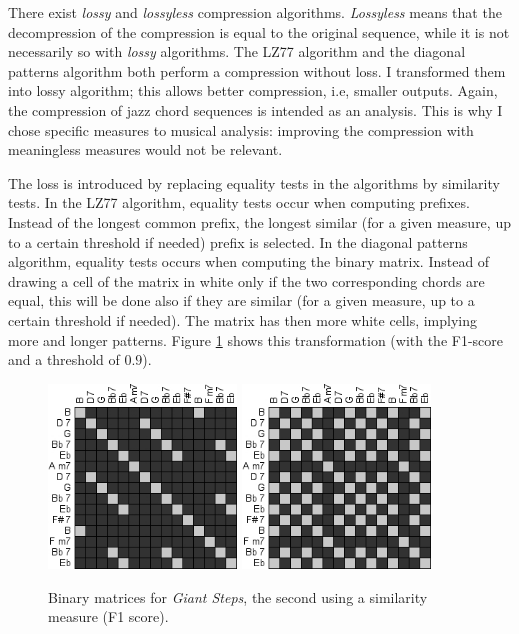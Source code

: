 \documentclass[a4paper,10pt]{article}
\begin{document}
There exist \emph{lossy} and \emph{lossyless} compression algorithms. \emph{Lossyless} means that the decompression of the compression is equal to the original sequence, while it is not necessarily so with \emph{lossy} algorithms. The LZ77 algorithm and the diagonal patterns algorithm both perform a compression without loss. I transformed them into lossy algorithm; this allows better compression, i.\!e, smaller outputs. Again, the compression of jazz chord sequences is intended as an analysis. This is why I chose specific measures to musical analysis: improving the compression with meaningless measures would not be relevant.

The loss is introduced by replacing equality tests in the algorithms by similarity tests. In the LZ77 algorithm, equality tests occur when computing prefixes. Instead of the longest common prefix, the longest similar (for a given measure, up to a certain threshold if needed) prefix is selected. In the diagonal patterns algorithm, equality tests occurs when computing the binary matrix. Instead of drawing a cell of the matrix in white only if the two corresponding chords are equal, this will be done also if they are similar (for a given measure, up to a certain threshold if needed). The matrix has then more white cells, implying more and longer patterns. Figure \ref{loose} shows this transformation (with the F1-score and a threshold of $0.9$).

\begin{figure}
\centering
\includegraphics[width=5cm]{images/diagonals1.jpg}\hspace{1cm}
\includegraphics[width=5cm]{images/diagonals3.jpg}
\caption{Binary matrices for \emph{Giant Steps}, the second using a similarity measure (F1 score).\label{loose}}
\end{figure}
\end{document}
